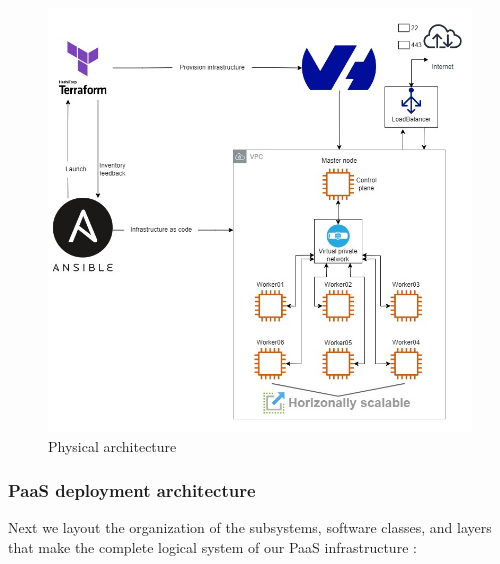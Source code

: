 \begin{figure}[H]\centering
\includegraphics[width=1.0\textwidth,angle=00]{assets/f7.jpg}
\caption{Physical architecture}
\label{fig:f7}
\end{figure}

\newpage

\subsubsection{PaaS deployment architecture} 
Next we layout the organization of the subsystems, software classes, and layers that make the complete logical system of our PaaS infrastructure :

